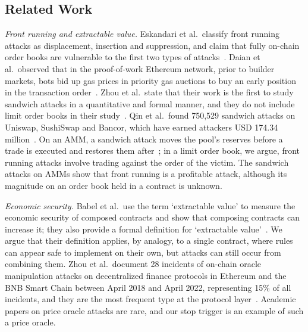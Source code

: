 \subsection{Related Work}\label{sec:related}
\emph{Front running and extractable value.}
Eskandari et al.\ classify front running attacks as displacement, insertion and suppression, and claim that fully on-chain order books are vulnerable to the first two types of attacks~\cite{src02eskandari2019}. %
Daian et al.\ observed that in the proof-of-work Ethereum network, prior to builder markets, bots bid up gas prices in priority gas auctions to buy an early position in the transaction order~\cite{src01daian2020}. %
Zhou et al.\ state that their work is the first to study sandwich attacks in a quantitative and formal manner, and they do not include limit order books in their study~\cite{src04zhou2021}. %
Qin et al.\ found 750{,}529 sandwich attacks on Uniswap, SushiSwap and Bancor, which have earned attackers USD 174.34 million~\cite{src05qin2022}. %
On an AMM, a sandwich attack moves the pool's reserves before a trade is executed and restores them after~\cite{src04zhou2021}; in a limit order book, we argue, front running attacks involve trading against the order of the victim. %
The sandwich attacks on AMMs show that front running is a profitable attack, although its magnitude on an order book held in a contract is unknown. %

\emph{Economic security.}
Babel et al.\ use the term `extractable value' to measure the economic security of composed contracts and show that composing contracts can increase it; they also provide a formal definition for `extractable value'~\cite{src08babel2023}. %
We argue that their definition applies, by analogy, to a single contract, where rules can appear safe to implement on their own, but attacks can still occur from combining them. %
Zhou et al.\ document 28 incidents of on-chain oracle manipulation attacks on decentralized finance protocols in Ethereum and the BNB Smart Chain between April 2018 and April 2022, representing 15\% of all incidents, and they are the most frequent type at the protocol layer~\cite{src06zhou2023}. %
Academic papers on price oracle attacks are rare, and our stop trigger is an example of such a price oracle. %

